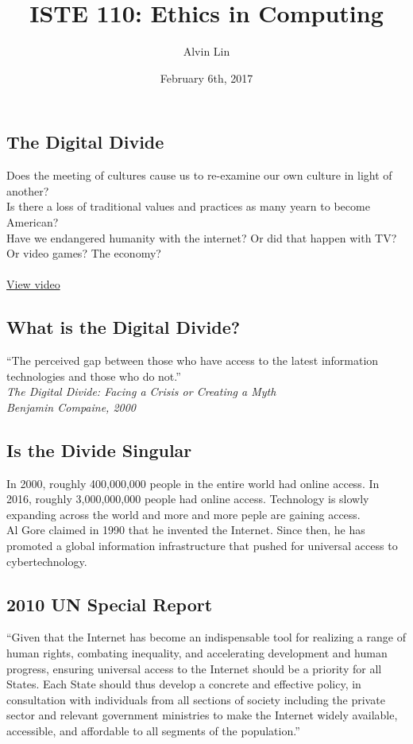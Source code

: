 \documentclass{article}
\title{ISTE 110: Ethics in Computing}
\author{Alvin Lin}
\date{February 6th, 2017}
\begin{document}
\maketitle

\subsection*{The Digital Divide}
Does the meeting of cultures cause us to re-examine our own culture in light of
another? \\
Is there a loss of traditional values and practices as many yearn to become
American? \\
Have we endangered humanity with the internet? Or did that happen with TV? Or
video games? The economy? \\ \\
\href{http://www.theglobeandmail.com/report-on-business/industry-news/marketing/molsons-newest-red-beer-fridge-touts-canadas-multicultural-side/article25116524/}{View video}

\subsection*{What is the Digital Divide?}
``The perceived gap between those who have access to the latest information
technologies and those who do not.'' \\
\textit{The Digital Divide: Facing a Crisis or Creating a Myth} \\
\textit{Benjamin Compaine, 2000}

\subsection*{Is the Divide Singular}
In 2000, roughly 400,000,000 people in the entire world had online access. In
2016, roughly 3,000,000,000 people had online access. Technology is slowly
expanding across the world and more and more peple are gaining access. \\
Al Gore claimed in 1990 that he invented the Internet. Since then, he has
promoted a global information infrastructure that pushed for universal access to
cybertechnology. \\

\subsection*{2010 UN Special Report}
``Given that the Internet has become an indispensable tool for realizing a
range of human rights, combating inequality, and accelerating development and
human progress, ensuring universal access to the Internet should be a priority
for all States. Each State should thus develop a concrete and effective policy,
in consultation with individuals from all sections of society including the
private sector and relevant government ministries to make the Internet widely
available, accessible, and affordable to all segments of the population.''
\end{document}
